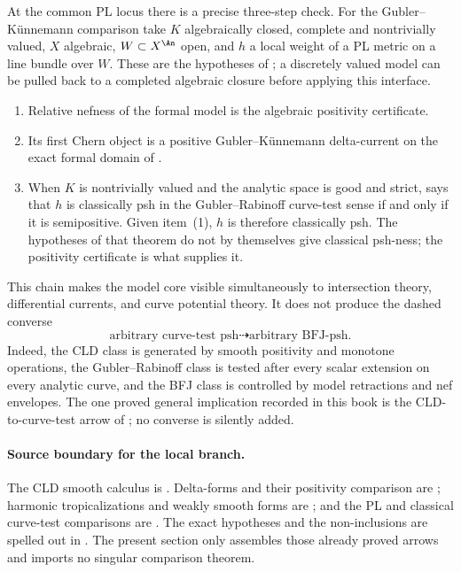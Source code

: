 At the common PL locus there is a precise three-step check. For the
Gubler--K\"unnemann comparison take $K$ algebraically closed, complete
and nontrivially valued, $X$ algebraic, $W\subset X^{\An}$ open,
and $h$ a local weight of a PL metric on a line bundle over $W$.
These are the hypotheses of ;
a discretely valued model can be pulled back to a completed algebraic
closure before applying this interface.

\begin{enumerate}
\item Relative nefness of the formal model is the algebraic positivity
certificate.

\item Its first Chern object is a positive Gubler--K\"unnemann
delta-current on the exact formal domain of
.

\item When $K$ is nontrivially valued and the analytic space is good and
strict,  says that $h$ is classically psh in
the Gubler--Rabinoff curve-test sense if and only if it is semipositive.
Given item~(1), $h$ is therefore classically psh.  The hypotheses of that
theorem do not by themselves give classical psh-ness; the positivity
certificate is what supplies it.
\end{enumerate}

This chain makes the model core visible simultaneously to intersection
theory, differential currents, and curve potential theory.  It does not
produce the dashed converse
\[
 \text{arbitrary curve-test psh}
       \dashrightarrow
 \text{arbitrary BFJ-psh}.
\tag{63.9}\label{eq:dict-forbidden-local-global-converse}
\]
Indeed, the CLD class is generated by smooth positivity and monotone
operations, the Gubler--Rabinoff class is tested after every scalar extension
on every analytic curve, and the BFJ class is controlled by model
retractions and nef envelopes.  The one proved general implication recorded
in this book is the CLD-to-curve-test arrow of
; no converse is silently added.

\paragraph{Source boundary for the local branch.}
The CLD smooth calculus is \cite{CLD25}.  Delta-forms and their positivity
comparison are \cite{GK17,GK19}; harmonic tropicalizations and weakly smooth
forms are \cite{GJR26}; and the PL and classical curve-test comparisons are
\cite{GR25PL,GR25Classical}.  The exact hypotheses and the non-inclusions are
spelled out in .  The present section only assembles
those already proved arrows and imports no singular comparison theorem.

